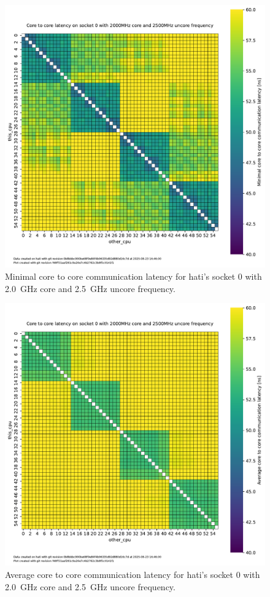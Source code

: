 \begin{figure}[]
    \centering
    \includegraphics[width=\columnwidth]{fig/core-to-core-latency/core-to-core-heatmap-min-2000-2500.pdf}
    \caption{Minimal core to core communication latency for hati's socket 0 with \SI{2.0}{\GHz} core and \SI{2.5}{\GHz} uncore frequency.}
\end{figure}
\begin{figure}[]
    \centering
    \includegraphics[width=\columnwidth]{fig/core-to-core-latency/core-to-core-heatmap-avg-2000-2500.pdf}
    \caption{Average core to core communication latency for hati's socket 0 with \SI{2.0}{\GHz} core and \SI{2.5}{\GHz} uncore frequency.}
\end{figure}
